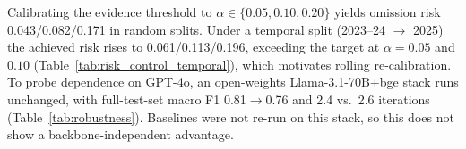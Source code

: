 Calibrating the evidence threshold to $\alpha\in\{0.05,0.10,0.20\}$ yields omission risk 0.043/0.082/0.171 in random splits. Under a temporal split (2023--24 $\rightarrow$ 2025) the achieved risk rises to 0.061/0.113/0.196, exceeding the target at $\alpha{=}0.05$ and $0.10$ (Table~\ref{tab:risk_control_temporal}), which motivates rolling re-calibration. To probe dependence on GPT-4o, an open-weights Llama-3.1-70B+bge stack runs unchanged, with full-test-set macro F1 0.81$\rightarrow$0.76 and 2.4 vs.\ 2.6 iterations (Table~\ref{tab:robustness}). Baselines were not re-run on this stack, so this does not show a backbone-independent advantage.
